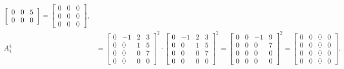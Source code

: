 \documentclass[12pt,a4paper]{article}
\begin{document}
\begin{enumerate}
\begin{enumerate}
\begin{enumerate}
\begin{align*}
\begin{bmatrix}
0 &  0 & 5 \\
0 &  0 & 0
\end{bmatrix}
=
\begin{bmatrix}
0 & 0 & 0 \\
0 & 0 & 0 \\
0 & 0 & 0
\end{bmatrix},\\
A_4^4 & =
\begin{bmatrix}
0 & -1 & 2 & 3 \\
0 &  0 & 1 & 5 \\
0 &  0 & 0 & 7 \\
0 &  0 & 0 & 0
\end{bmatrix}^2
\cdot
\begin{bmatrix}
0 & -1 & 2 & 3 \\
0 &  0 & 1 & 5 \\
0 &  0 & 0 & 7 \\
0 &  0 & 0 & 0
\end{bmatrix}^2
=
\begin{bmatrix}
0 & 0 & -1 & 9 \\
0 & 0 & 0 & 7 \\
0 & 0 & 0 & 0 \\
0 & 0 & 0 & 0
\end{bmatrix}^2
=
\begin{bmatrix}
0 & 0 & 0 & 0 \\
0 & 0 & 0 & 0 \\
0 & 0 & 0 & 0 \\
0 & 0 & 0 & 0
\end{bmatrix}.
\end{align*}


\end{enumerate}
\end{enumerate}
\end{enumerate}
\end{document}
